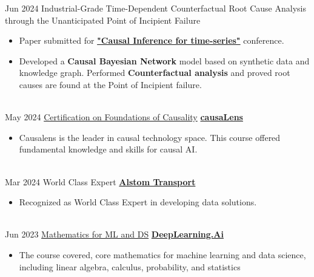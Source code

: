 \documentclass[letterpaper]{DS_class_file} %
\begin{document}
\begin{twenty} %
	\twentyitem
	{Jun 2024}
	{}
	{\hspace{0.3cm}Industrial-Grade Time-Dependent Counterfactual Root Cause Analysis through
the Unanticipated Point of Incipient Failure}
	{}
	{}
	{\begin{itemize}
		\item Paper submitted for \href{https://sites.google.com/view/ci4ts2024/home}{\textbf{"Causal Inference for time-series"}} conference.
        \item Developed a \textbf{Causal Bayesian Network} model based on synthetic data and knowledge graph. Performed \textbf{Counterfactual analysis} and proved root causes are found at the Point of Incipient failure.    
	\end{itemize}}
	\\
	\twentyitem
	{May 2024}
	{}
	{\hspace{0.3cm}\href{https://causalens-foundations-of-causality-certificates.s3.amazonaws.com/a698fab1-0028-4e12-a2a4-5986c7ac6c8d.png} {Certification on Foundations of Causality}}
	{\href{https://causalens.com/}{\textbf{causaLens}}}
	{}
	{
		{\begin{itemize}
				\item Causalens is the leader in causal technology space. This course offered fundamental knowledge and skills for causal AI.
		\end{itemize}}
	}
	\\
    \twentyitem
	{Mar 2024}
	{}
	{\hspace{0.3cm}World Class Expert}
	{\href{https://www.alstom.com/alstom-india}{\textbf{Alstom Transport}}}
	{}
	{\begin{itemize}
			\item Recognized as World Class Expert in developing data solutions.
	\end{itemize}}
    \\
    \twentyitem
	{Jun 2023}
	{}
	{\hspace{0.3cm}\href{https://coursera.org/share/a5ca8400ac0a60d8aeee64f91816d879}{ Mathematics for ML and DS}}
	{\href{https://www.deeplearning.ai/}{\textbf{DeepLearning.Ai}}}
	{}
	{\begin{itemize}
			\item The course covered, core mathematics for machine learning and data science, including linear algebra, calculus, probability, and statistics
	\end{itemize}}
    \\

\end{twenty}
\end{document}
